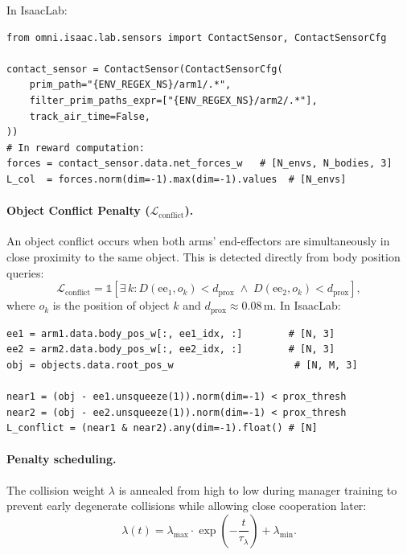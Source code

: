 \documentclass[12pt, a4paper]{article}
\newcommand{\calL}{\mathcal{L}}
\begin{document}
In IsaacLab:
\begin{verbatim}
from omni.isaac.lab.sensors import ContactSensor, ContactSensorCfg

contact_sensor = ContactSensor(ContactSensorCfg(
    prim_path="{ENV_REGEX_NS}/arm1/.*",
    filter_prim_paths_expr=["{ENV_REGEX_NS}/arm2/.*"],
    track_air_time=False,
))
# In reward computation:
forces = contact_sensor.data.net_forces_w   # [N_envs, N_bodies, 3]
L_col  = forces.norm(dim=-1).max(dim=-1).values  # [N_envs]
\end{verbatim}

\paragraph{Object Conflict Penalty ($\calL_{\mathrm{conflict}}$).}
An object conflict occurs when both arms' end-effectors are simultaneously in close
proximity to the same object. This is detected directly from body position queries:
\begin{equation}
    \calL_{\mathrm{conflict}} = \mathbb{1}\!\left[
        \exists\, k : D(\mathrm{ee}_1, o_k) < d_{\mathrm{prox}}
        \;\wedge\;
        D(\mathrm{ee}_2, o_k) < d_{\mathrm{prox}}
    \right],
    \label{eq:conflict_penalty}
\end{equation}
where $o_k$ is the position of object $k$ and $d_{\mathrm{prox}} \approx 0.08$\,m.
In IsaacLab:
\begin{verbatim}
ee1 = arm1.data.body_pos_w[:, ee1_idx, :]        # [N, 3]
ee2 = arm2.data.body_pos_w[:, ee2_idx, :]        # [N, 3]
obj = objects.data.root_pos_w                     # [N, M, 3]

near1 = (obj - ee1.unsqueeze(1)).norm(dim=-1) < prox_thresh
near2 = (obj - ee2.unsqueeze(1)).norm(dim=-1) < prox_thresh
L_conflict = (near1 & near2).any(dim=-1).float() # [N]
\end{verbatim}

\paragraph{Penalty scheduling.}
The collision weight $\lambda$ is annealed from high to low during manager training to
prevent early degenerate collisions while allowing close cooperation later:
\begin{equation}
    \lambda(t) = \lambda_{\max} \cdot \exp\!\left(-\frac{t}{\tau_\lambda}\right) + \lambda_{\min}.
\end{equation}

\end{document}
